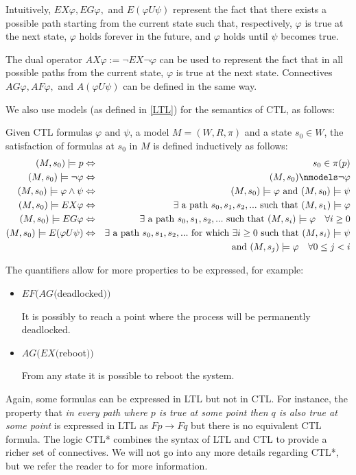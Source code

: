 \documentclass[11pt]{report}
\newenvironment{definition}[1][Definition]{\begin{trivlist}
\item[\hskip \labelsep {\bfseries #1}]}{\end{trivlist}}
\begin{document}
Intuitively, $ EX\varphi,  EG\varphi,$ and $ E(\varphi U \psi)$ represent the fact that there exists a possible path starting from the current state such that, respectively, $\varphi$ is true at the next state, $\varphi$ holds forever in the future, and $\varphi$ holds until $\psi$ becomes true.

The dual operator $AX\varphi := \lnot EX \lnot\varphi $ can be used to represent the fact that in all possible paths from the current state, $\varphi$ is true at the next state.
Connectives $AG\varphi, AF\varphi,$ and $A(\varphi U\psi)$ can be defined in the same way. 

We also use models (as defined in \ref{LTL}) for the semantics of CTL, as follows:

\begin{definition} 
Given CTL formulas $\varphi$ and $\psi$, a model $M = (W, R, \pi)$ and a state $s_0 \in W$, the satisfaction of formulas at $s_0$ in $M$ is defined inductively as follows: 
\begin{eqnarray*}
(M, s_0) \models p &\Leftrightarrow& s_0 \in \pi(p) \\  
(M, s_0) \models \lnot \varphi &\Leftrightarrow& (M, s_0) \nmodels \lnot \varphi\\
(M, s_0) \models \varphi \land \psi &\Leftrightarrow& (M, s_0) \models \varphi \mbox{ and  } (M, s_0) \models \psi \\
(M, s_0) \models EX\varphi &\Leftrightarrow& \exists \mbox{ a path } s_0, s_1, s_2, ... \mbox{ such that } (M, s_1) \models \varphi \\
(M, s_0) \models EG\varphi &\Leftrightarrow& \exists \mbox{ a path } s_0, s_1, s_2, ... \mbox{ such that } (M, s_i) \models \varphi \quad \forall i \geq 0\\
(M, s_0) \models E(\varphi U\psi) &\Leftrightarrow&  \exists \mbox{ a path } s_0, s_1, s_2, ... \mbox{ for which } \exists i \geq 0 \mbox{ such that }  (M, s_i) \models \psi \\ && \mbox{ and }  (M, s_j) \models \varphi \quad \forall 0 \leq j < i
\end{eqnarray*}
\end{definition}
The quantifiers allow for more properties to be expressed, for example:
\begin{itemize}

\item $EF(AG($deadlocked$))$

It is possibly to reach a point where the process will be permanently deadlocked.

\item $AG(EX($reboot$))$ 

From any state it is possible to reboot the system.


\end{itemize}
Again, some formulas can be expressed in LTL but not in CTL. For instance, the property that \textit{in every path where $p$ is true at some point then $q$ is also true at some point} is expressed in LTL as $Fp \rightarrow Fq $ but there is no equivalent CTL formula.
 The logic CTL* combines the syntax of LTL and CTL to provide a richer set of connectives. We will not go into any more details regarding CTL*, but we refer the reader to \cite{ctl*} for more information. 
\end{document}
